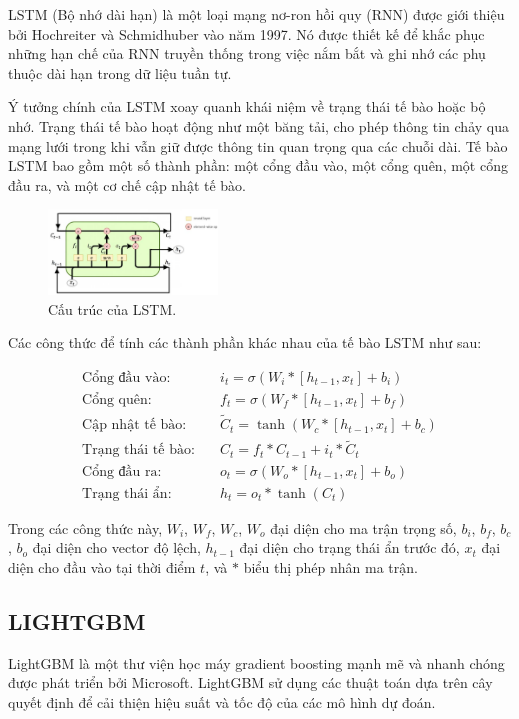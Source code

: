 \documentclass[conference]{IEEEtran}
\begin{document}
LSTM (Bộ nhớ dài hạn) là một loại mạng nơ-ron hồi quy (RNN) được giới thiệu bởi Hochreiter và Schmidhuber vào năm 1997. Nó được thiết kế để khắc phục những hạn chế của RNN truyền thống trong việc nắm bắt và ghi nhớ các phụ thuộc dài hạn trong dữ liệu tuần tự.

Ý tưởng chính của LSTM xoay quanh khái niệm về trạng thái tế bào hoặc bộ nhớ. Trạng thái tế bào hoạt động như một băng tải, cho phép thông tin chảy qua mạng lưới trong khi vẫn giữ được thông tin quan trọng qua các chuỗi dài. Tế bào LSTM bao gồm một số thành phần: một cổng đầu vào, một cổng quên, một cổng đầu ra, và một cơ chế cập nhật tế bào.
\begin{figure}[h]
    \centering
    \includegraphics[width=0.4\textwidth]{bibliography/pictures/lstm.png}
  \caption{Cấu trúc của LSTM.}
\end{figure}
Các công thức để tính các thành phần khác nhau của tế bào LSTM như sau: 


\begin{align*}
\text{Cổng đầu vào:} \quad & i_t = \sigma(W_i * [h_{t-1}, x_t] + b_i) \\
\text{Cổng quên:} \quad & f_t = \sigma(W_f * [h_{t-1}, x_t] + b_f) \\
\text{Cập nhật tế bào:} \quad & \tilde{C}_t = \tanh(W_c * [h_{t-1}, x_t] + b_c) \\
\text{Trạng thái tế bào:} \quad & C_t = f_t * C_{t-1} + i_t * \tilde{C}_t \\
\text{Cổng đầu ra:} \quad & o_t = \sigma(W_o * [h_{t-1}, x_t] + b_o) \\
\text{Trạng thái ẩn:} \quad & h_t = o_t * \tanh(C_t)
\end{align*}

Trong các công thức này, $W_i$, $W_f$, $W_c$, $W_o$ đại diện cho ma trận trọng số, $b_i$, $b_f$, $b_c$, $b_o$ đại diện cho vector độ lệch, $h_{t-1}$ đại diện cho trạng thái ẩn trước đó, $x_t$ đại diện cho đầu vào tại thời điểm $t$, và $*$ biểu thị phép nhân ma trận.

\subsection{LIGHTGBM}
LightGBM là một thư viện học máy gradient boosting mạnh mẽ và nhanh chóng được phát triển bởi Microsoft. LightGBM sử dụng các thuật toán dựa trên cây quyết định để cải thiện hiệu suất và tốc độ của các mô hình dự đoán.
\end{document}
